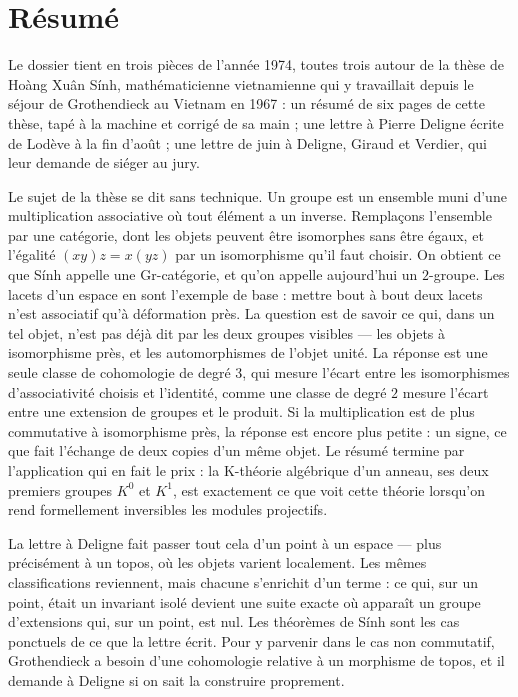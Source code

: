 \documentclass[11pt,a4paper]{article}
\begin{document}
\section*{Résumé}

\begin{resume}
Le dossier tient en trois pièces de l'année 1974, toutes trois autour de la
thèse de Hoàng Xuân Sính, mathématicienne vietnamienne qui y travaillait
depuis le séjour de Grothendieck au Vietnam en 1967 : un résumé de six
pages de cette thèse, tapé à la machine et corrigé de sa main ; une lettre à
Pierre Deligne écrite de Lodève à la fin d'août ; une lettre de juin à
Deligne, Giraud et Verdier, qui leur demande de siéger au jury.

Le sujet de la thèse se dit sans technique. Un groupe est un ensemble muni
d'une multiplication associative où tout élément a un inverse. Remplaçons
l'ensemble par une catégorie, dont les objets peuvent être isomorphes sans
être égaux, et l'égalité $(xy)z = x(yz)$ par un isomorphisme qu'il faut
choisir. On obtient ce que Sính appelle une Gr-catégorie, et qu'on appelle
aujourd'hui un $2$-groupe. Les lacets d'un espace en sont l'exemple de base :
mettre bout à bout deux lacets n'est associatif qu'à déformation près. La
question est de savoir ce qui, dans un tel objet, n'est pas déjà dit par les
deux groupes visibles --- les objets à isomorphisme près, et les
automorphismes de l'objet unité. La réponse est une seule classe de
cohomologie de degré $3$, qui mesure l'écart entre les isomorphismes
d'associativité choisis et l'identité, comme une classe de degré $2$ mesure
l'écart entre une extension de groupes et le produit. Si la multiplication est
de plus commutative à isomorphisme près, la réponse est encore plus petite :
un signe, ce que fait l'échange de deux copies d'un même objet. Le résumé
termine par l'application qui en fait le prix : la K-théorie algébrique d'un
anneau, ses deux premiers groupes $K^0$ et $K^1$, est exactement ce que voit
cette théorie lorsqu'on rend formellement inversibles les modules projectifs.

La lettre à Deligne fait passer tout cela d'un point à un espace --- plus
précisément à un topos, où les objets varient localement. Les mêmes
classifications reviennent, mais chacune s'enrichit d'un terme : ce qui, sur
un point, était un invariant isolé devient une suite exacte où apparaît un
groupe d'extensions qui, sur un point, est nul. Les théorèmes de Sính sont les
cas ponctuels de ce que la lettre écrit. Pour y parvenir dans le cas non
commutatif, Grothendieck a besoin d'une cohomologie relative à un morphisme de
topos, et il demande à Deligne si on sait la construire proprement.


\end{resume}
\end{document}
